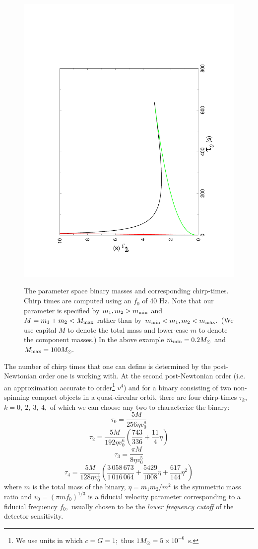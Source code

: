 \begin{figure}[h]
{\noindent\includegraphics[angle=-90,width=0.49\linewidth]{./LALInspiralBankHt0t3}
}
\caption{The parameter space binary masses and corresponding
chirp-times. Chirp times are computed using an $f_0$ of 40 Hz. Note
that our parameter is specified by $m_1, m_2 >m_{\rm min}$ and 
$M=m_1+m_2 < M_{\rm max}$ rather than by $m_{\rm min} < m_1,m_2 < m_{\rm max}.$
(We use capital $M$ to denote the total mass and lower-case $m$ to denote
the component masses.) In the above example $m_{\rm min} = 0.2 M_\odot$
and $M_{\rm max} = 100 M_\odot.$}
\label{fig:chirp-times}
\end{figure}

The number of chirp
times that one can define is determined by the post-Newtonian order
one is working with. At the second post-Newtonian order (i.e. 
an approximation accurate to order\footnote{We use units in 
which $c=G=1;$ thus $1M_\odot=5\times 10^{-6}$~s.} $v^4$) and for
a binary consisting of two non-spinning compact objects in a quasi-circular
orbit, there are
four chirp-times $\tau_k,$ $k=0,\ 2,\ 3,\ 4,$ of which we can choose
any two to characterize the binary:
\begin{equation}
\tau_{0} = \frac{5M}{256 \eta v_{0}^{8}}
\end{equation}
\begin{equation}
\tau_{2} = \frac{5M}{192 \eta v_{0}^{6}} \left( \frac{743}{336} + \frac{11}{4} \eta \right)
\end{equation}
\begin{equation}
\tau_{3} = \frac{\pi M}{8 \eta v_{0}^{5}}
\end{equation}
\begin{equation}
\tau_{4} = \frac{5M}{128 \eta v_{0}^4} \left( \frac{3\,058\,673}{1\,016\,064} + \frac{5429}{1008}
\eta +
\frac{617}{144} \eta^{2} \right)
\end{equation}
where $m$ is the total mass of the
binary, $\eta=m_1m_2/m^2$ is the symmetric mass ratio and   
$v_0 = (\pi m f_0)^{1/3}$ is a fiducial velocity parameter corresponding
to a fiducial frequency $f_0,$ usually chosen to be the {\it lower 
frequency cutoff} of the detector sensitivity. 


